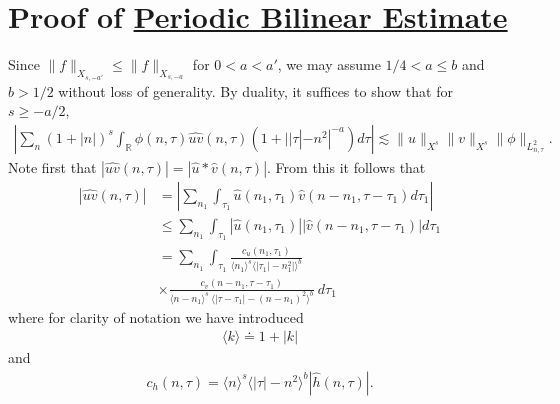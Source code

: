 \documentclass[12pt,reqno]{amsart}
\numberwithin{equation}{section}  %
\newcommand{\rr}{\mathbb{R}}
\newcommand{\wh}{\widehat}
\begin{document}
\section{Proof of \hyperref[prop:bilinear-est]{Periodic Bilinear Estimate}} 
\label{sec:proof-bilin-est}
Since $\|f\|_{X_{s,-a'}} \le \|f\|_{X_{s, -a}}$ for $0 < a < a'$, we may assume
$1/4 < a \le b$ and $b > 1/2$ without loss of generality.
By duality, it suffices to show that for $s \ge -a/2$, 
%
\begin{equation}
	\label{duality-est}
	\begin{split}
	|	\sum_{n}  (1 + |n|)^{s}
		\int_{\rr} \phi(n, \tau) \wh{uv}(n, \tau)(1 
    + | |\tau| - n^{2} |^{-a}) d \tau | \lesssim \|u\|_{X^{s}}
    \|v\|_{X^{s}}
    \|\phi \|_{L^{2}_{n, \tau}}.
	\end{split}
\end{equation}
Note first that $|\wh{uv}(n, \tau) |  = | \wh{u} *  \wh{v} 
(n, \tau)|$. From this it follows that
%
%
\begin{equation}
	\label{non-lin-rep}
	\begin{split}
		| \wh{uv}(n, \tau)|
    & = | \sum_{n_{1} }  \int_{\tau_{1}}
    \wh{u}\left( n_1,  \tau_1 \right) \wh{v}\left( n - n_1 , \tau - \tau_1   
\right) d \tau_1 |
\\
& \le  \sum_{n_{1} }  \int_{\tau_{1}}
    |\wh{u}\left( n_1,  \tau_1 \right)| |\wh{v}\left( n - n_1 , \tau - \tau_1   
\right)| d \tau_1 
\\
& = \sum_{n_{1} } \int_{\tau_{1}} \frac{c_u\left( n_1, \tau_1 
\right)}{\langle n_1 \rangle ^s \langle |\tau_1| - n_1^{2} | \rangle ^{b}}
\\
& \times \frac{c_{v}\left( n - n_1, \tau - \tau_1 \right)}{\langle n -
n_1 \rangle ^s\ \langle |\tau - \tau_1 | -  (n - n_1)^{2} \rangle^{b}}
  \ d \tau_1 
\end{split}
\end{equation}
%
%
where for clarity of notation we have introduced 
%
%
%
\begin{equation*}
\begin{split}
\langle k \rangle \doteq 1 + |k|
\end{split}
\end{equation*}
%
%
and
%
\begin{equation*}
	\begin{split}
		c_h(n, \tau) =
			\langle n \rangle ^s \langle |\tau| - n^{2} \rangle ^{b} | \wh{h}\left( n, \tau \right) |.
	\end{split}
\end{equation*}
\end{document}

